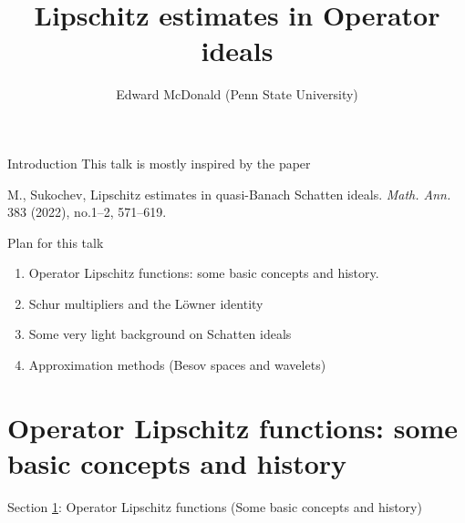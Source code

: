 \documentclass{beamer}
\newcommand\makebeamertitle{\frame{\maketitle}}%
\numberwithin{equation}{section}
\theoremstyle{plain}
\theoremstyle{plain}
\theoremstyle{definition}
\theoremstyle{plain}
\theoremstyle{plain}
\theoremstyle{definition}
\begin{document}
\title[Lipschitz estimates for operators]{Lipschitz estimates in Operator ideals}


\author[E. McDonald]{Edward McDonald (Penn State University)}





\makebeamertitle


\begin{frame}{Introduction}
    This talk is mostly inspired by the paper
    \begin{center}
    M., Sukochev, Lipschitz estimates in quasi-Banach Schatten ideals.
    \emph{Math. Ann.} 383 (2022), no.1--2, 571--619.
    \end{center}
\end{frame}

\begin{frame}{Plan for this talk}
    \begin{enumerate}
        \item{} Operator Lipschitz functions: some basic concepts and history.
        \item{} Schur multipliers and the L\"owner identity
        \item{} Some very light background on Schatten ideals
        \item{} Approximation methods (Besov spaces and wavelets)
    \end{enumerate}
\end{frame}


\section{Operator Lipschitz functions: some basic concepts and history}\label{section_intro}

\begin{frame}
    \Huge{Section \ref{section_intro}: Operator Lipschitz functions (Some basic concepts and history)}
\end{frame}
\end{document}
